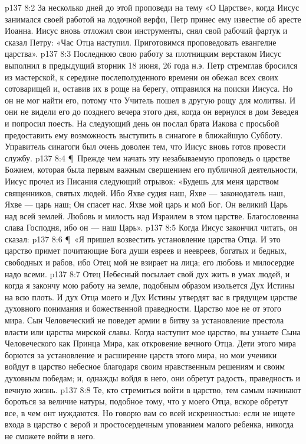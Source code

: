 \vs p137 8:2 За несколько дней до этой проповеди на тему «О Царстве», когда Иисус занимался своей работой на лодочной верфи, Петр принес ему известие об аресте Иоанна. Иисус вновь отложил свои инструменты, снял свой рабочий фартук и сказал Петру: «Час Отца наступил. Приготовимся проповедовать евангелие царства».
\vs p137 8:3 Последнюю свою работу за плотницким верстаком Иисус выполнил в предыдущий вторник 18 июня, 26 года н.э. Петр стремглав бросился из мастерской, к середине послеполуденного времени он обежал всех своих сотоварищей и, оставив их в роще на берегу, отправился на поиски Иисуса. Но он не мог найти его, потому что Учитель пошел в другую рощу для молитвы. И они не видели его до позднего вечера этого дня, когда он вернулся в дом Зеведея и попросил поесть. На следующий день он послал брата Иакова с просьбой предоставить ему возможность выступить в синагоге в ближайшую Субботу. Управитель синагоги был очень доволен тем, что Иисус вновь готов провести службу.
\vs p137 8:4 \P\ Прежде чем начать эту незабываемую проповедь о царстве Божием, которая была первым важным свершением его публичной деятельности, Иисус прочел из Писания следующий отрывок: «Будешь для меня царством священников, святых людей. Ибо Яхве судия наш, Яхве --- законодатель наш, Яхве --- царь наш; Он спасет нас. Яхве мой царь и мой Бог. Он великий Царь над всей землей. Любовь и милость над Израилем в этом царстве. Благословенна слава Господня, ибо он --- наш Царь».
\vs p137 8:5 Когда Иисус закончил читать, он сказал:
\vs p137 8:6 \P\ «Я пришел возвестить установление царства Отца. И это царство примет почитающие Бога души евреев и неевреев, богатых и бедных, свободных и рабов, ибо Отец мой не взирает на лица; его любовь и милосердие надо всеми.
\vs p137 8:7 Отец Небесный посылает свой дух жить в умах людей, и когда я закончу мою работу на земле, подобным образом изольется Дух Истины на всю плоть. И дух Отца моего и Дух Истины утвердят вас в грядущем царстве духовного понимания и божественной праведности. Царство мое не от этого мира. Сын Человеческий не поведет армии в битву за установление престола власти или царства мирской славы. Когда наступит мое царство, вы узнаете Сына Человеческого как Принца Мира, как откровение вечного Отца. Дети этого мира борются за установление и расширение царств этого мира, но мои ученики войдут в царство небесное благодаря своим нравственным решениям и своим духовным победам; и, однажды войдя в него, они обретут радость, праведность и вечную жизнь.
\vs p137 8:8 Те, кто стремиться войти в царство, тем самым начинают бороться за величие натуры, подобное тому, что у моего Отца, вскоре обретут все, в чем онт нуждаются. Но говорю вам со всей искренностью: если не ищете входа в царство с верой и простосердечным упованием малого ребенка, никогда не сможете войти в него.
